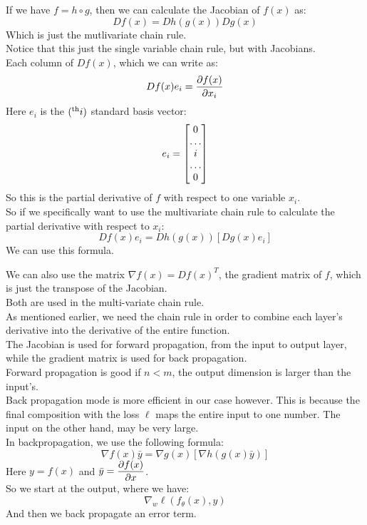 \documentclass[12pt]{article}
\begin{document}
If we have $f = h \circ g$, then we
can calculate the Jacobian of $f(x)$ as:
\[ Df(x) = Dh(g(x))Dg(x) \]
Which is just the mutlivariate chain rule. \\
Notice that this just the single variable chain
rule, but with Jacobians. \\

Each column of $Df(x)$, which we can write as:
\[ Df(x)e_i = \dfrac{\partial f(x)}{\partial x_i} \]
Here $e_i$ is the $(^{\text{th}}i)$ standard basis
vector:
\[ e_i = \begin{bmatrix} 0 \\ \dots \\ i \\ \dots \\ 0 \end{bmatrix} \]
So this is the partial derivative of 
$f$ with respect to one variable $x_i$. \\

So if we specifically want to use the
multivariate chain rule to calculate
the partial derivative with respect to $x_i$:
\[ Df(x)e_i = Dh(g(x))[Dg(x)e_i] \]
We can use this formula.

We can also use the matrix $\nabla f(x) = Df(x)^T$,
the gradient matrix of $f$, which is just the transpose
of the Jacobian. \\
Both are used in the multi-variate chain rule. \\

As mentioned earlier, we need the chain rule
in order to combine each layer's derivative
into the derivative of the entire function. \\
The Jacobian is used for forward propagation,
from the input to output layer, while the gradient 
matrix is used for back propagation. \\

Forward propagation is good if $n < m$,
the output dimension is larger than the input's. \\

Back propagation mode is more efficient
in our case however.
This is because the final composition with 
the loss $\ell$ maps the entire input to one number.
The input on the other hand, may be very large. \\

In backpropagation, we use the following formula:
\[ \nabla f(x) \bar{y} = 
\nabla g(x)[\nabla h(g(x)\bar{y})] \]
Here $y = f(x)$ and $\bar{y} = \dfrac{\partial f(x)}{\partial x}$. \\

So we start at the output, where we have:
\[ \nabla_w \ell(f_\theta(x), y) \]
And then we back propagate an error term. \\
\end{document}
